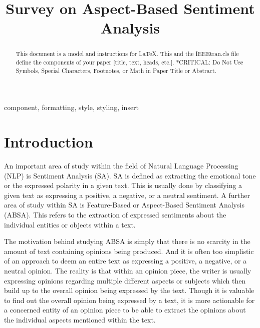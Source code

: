 \documentclass[conference]{IEEEtran}
\begin{document}
\title{Survey on Aspect-Based Sentiment Analysis}

\author{
}

\maketitle
\thispagestyle{plain}
\pagestyle{plain}

\begin{abstract}
This document is a model and instructions for \LaTeX.
This and the IEEEtran.cls file define the components of your paper [title, text, heads, etc.]. *CRITICAL: Do Not Use Symbols, Special Characters, Footnotes, 
or Math in Paper Title or Abstract.
\end{abstract}

\begin{IEEEkeywords}
component, formatting, style, styling, insert
\end{IEEEkeywords}

\section{Introduction}
An important area of study within the field of Natural Language Processing (NLP) is Sentiment Analysis (SA). SA is defined as extracting the emotional tone or the expressed polarity in a given text. This is usually done by classifying a given text as expressing a positive, a negative, or a neutral sentiment. A further area of study within SA is Feature-Based or Aspect-Based Sentiment Analysis (ABSA). This refers to the extraction of expressed sentiments about the individual entities or objects within a text.

The motivation behind studying ABSA is simply that there is no scarcity in the amount of text containing opinions being produced. And it is often too simplistic of an approach to deem an entire text as expressing a positive, a negative, or a neutral opinion. The reality is that within an opinion piece, the writer is usually expressing opinions regarding multiple different aspects or subjects which then build up to the overall opinion being expressed by the text. Though it is valuable to find out the overall opinion being expressed by a text, it is more actionable for a concerned entity of an opinion piece to be able to extract the opinions about the individual aspects mentioned within the text.
\end{document}
